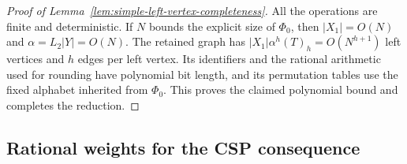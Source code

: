 \begin{proof}[Proof of Lemma~\ref{lem:simple-left-vertex-completeness}]
All the operations are finite and deterministic.  If \(N\) bounds the
explicit size of \(\Phi_0\), then \(|X_1|=O(N)\) and
\(\alpha=L_2|Y|=O(N)\).  The retained graph has
\(|X_1|\alpha^h(T)_h=O(N^{h+1})\) left vertices and \(h\) edges per
left vertex.  Its identifiers and the rational arithmetic used for
rounding have polynomial bit length, and its permutation tables use
the fixed alphabet inherited from \(\Phi_0\).  This proves the claimed
polynomial bound and completes the reduction.
\end{proof}

\subsection{Rational weights for the CSP consequence}
\label{subsec:raghavendra-proof}

